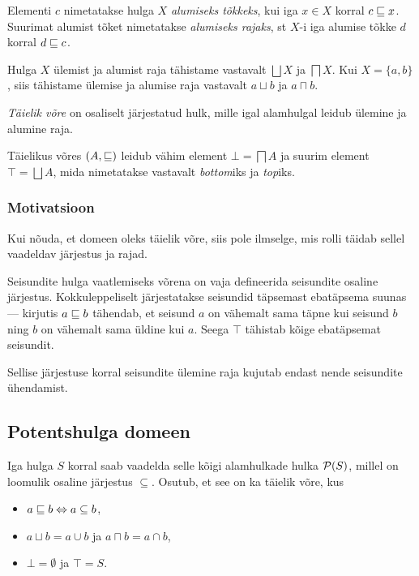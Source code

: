 \documentclass[../thesis.tex]{subfiles}
\begin{document}
\begin{definition}
\label{def:meet}
Elementi $c$ nimetatakse hulga $X$ \emph{alumiseks tõkkeks}, kui iga $x \in X$ korral $c \sqsubseteq x$. Suurimat alumist tõket nimetatakse \emph{alumiseks rajaks}, st $X$-i iga alumise tõkke $d$ korral $d \sqsubseteq c$.
\end{definition}

Hulga $X$ ülemist ja alumist raja tähistame vastavalt $\bigsqcup X$ ja $\bigsqcap X$. Kui $X = \{a, b\}$, siis tähistame ülemise ja alumise raja vastavalt $a \sqcup b$ ja $a \sqcap b$.

\begin{definition}
\emph{Täielik võre} on osaliselt järjestatud hulk, mille igal alamhulgal leidub ülemine ja alumine raja.
\end{definition}

Täielikus võres $(A, \sqsubseteq)$ leidub vähim element $\bot = \bigsqcap A$ ja suurim element $\top = \bigsqcup A$, mida nimetatakse vastavalt \textit{bottom}iks ja \textit{top}iks.

\subsubsection{Motivatsioon}
Kui nõuda, et domeen oleks täielik võre, siis pole ilmselge, mis rolli täidab sellel vaadeldav järjestus ja rajad.

Seisundite hulga vaatlemiseks võrena on vaja defineerida seisundite osaline järjestus. Kokkuleppeliselt järjestatakse seisundid täpsemast ebatäpsema suunas --- kirjutis $a \sqsubseteq b$ tähendab, et seisund $a$ on vähemalt sama täpne kui seisund $b$ ning $b$ on vähemalt sama üldine kui $a$. Seega $\top$ tähistab kõige ebatäpsemat seisundit.

Sellise järjestuse korral seisundite ülemine raja kujutab endast nende seisundite ühendamist.


\subsection{Potentshulga domeen}

Iga hulga $S$ korral saab vaadelda selle kõigi alamhulkade hulka $\mathcal{P}(S)$, millel on loomulik osaline järjestus $\subseteq$.
Osutub, et see on ka täielik võre, kus
\begin{itemize}[nosep]
	\item $a \sqsubseteq b \Leftrightarrow a \subseteq b$,
	\item $a \sqcup b = a \cup b$ ja $a \sqcap b = a \cap b$,
	\item $\bot = \emptyset$ ja $\top = S$.
\end{itemize}
\end{document}
